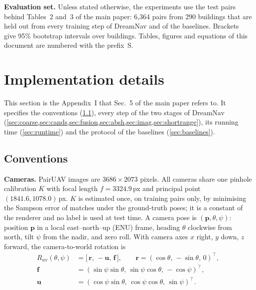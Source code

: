 \documentclass[10pt,twocolumn,letterpaper]{article}
\begin{document}
\noindent\textbf{Evaluation set.} Unless stated otherwise, the experiments use the test pairs behind Tables~2 and~3 of the main paper: 6{,}364 pairs from 290 buildings that are held out from every training step of DreamNav and of the baselines. Brackets give 95\% bootstrap intervals over buildings. Tables, figures and equations of this document are numbered with the prefix~S.

\section{Implementation details}
\label{sec:impl}

This section is the Appendix~I that Sec.~5 of the main paper refers to. It specifies the conventions (\cref{sec:conv}), every step of the two stages of DreamNav (\cref{sec:coarse,sec:cands,sec:fusion,sec:absh,sec:imag,sec:shortrange}), its running time (\cref{sec:runtime}) and the protocol of the baselines (\cref{sec:baselines}).

\subsection{Conventions}
\label{sec:conv}

\noindent\textbf{Cameras.} PairUAV images are $3686{\times}2073$ pixels. All cameras share one pinhole calibration $K$ with focal length $f{=}3324.9$\,px and principal point $(1841.6, 1078.0)$\,px. $K$ is estimated once, on training pairs only, by minimising the Sampson error of matches under the ground-truth poses; it is a constant of the renderer and no label is used at test time. A camera pose is $(\mathbf{p},\theta,\psi)$: position $\mathbf{p}$ in a local east--north--up (ENU) frame, heading $\theta$ clockwise from north, tilt $\psi$ from the nadir, and zero roll. With camera axes $x$ right, $y$ down, $z$ forward, the camera-to-world rotation is
\begin{equation}
\begin{aligned}
R_{wc}(\theta,\psi)&=\big[\,\mathbf{r},\,-\mathbf{u},\,\mathbf{f}\,\big],\qquad \mathbf{r}=(\cos\theta,\,-\sin\theta,\,0)^{\!\top},\\
\mathbf{f}&=(\sin\psi\sin\theta,\,\sin\psi\cos\theta,\,-\cos\psi)^{\!\top},\\
\mathbf{u}&=(\cos\psi\sin\theta,\,\cos\psi\cos\theta,\,\sin\psi)^{\!\top}.
\end{aligned}
\label{eq:rwc}
\end{equation}
\end{document}
